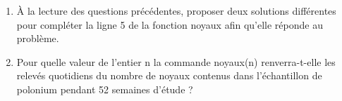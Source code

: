 \documentclass[10pt]{article}
\begin{document}
\begin{enumerate}
	\begin{enumerate}
		\item À la lecture des questions précédentes, proposer deux solutions différentes pour compléter la ligne 5 de la fonction noyaux afin qu'elle réponde au problème.
		\item Pour quelle valeur de l'entier n la commande noyaux(n) renverra-t-elle les relevés quotidiens du nombre de noyaux contenus dans l'échantillon de polonium pendant 52 semaines d'étude ?
	\end{enumerate}
\end{enumerate}

\medskip
\end{document}

